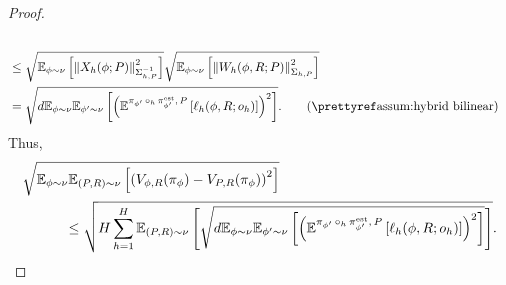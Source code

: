 \begin{proof}
\begin{align*}
\\&\le \sqrt{\E_{\phi \sim \nu}\left[\left\|X_h(\phi; P)\right\|_{\Sigma_{h,P}^{-1}}^2\right]} \sqrt{\E_{\phi \sim \nu}\left[\left\|W_h(\phi, R; P)\right\|_{\Sigma_{h,P}}^2\right]}
\\&= \sqrt{d\E_{\phi \sim \nu}\E_{\phi' \sim \nu}\left[\left(  \E^{\pi_{\phi'}\,\circ_h \, \pi_{\phi'}^{\esttt}, \,P}\left[\ellest_h(\phi, R; o_h)\right]\right)^2\right]}. \tag{\pref{assum:hybrid bilinear}}
\end{align*}
Thus, 
\begin{align*}
    &\sqrt{\mathbb{E}_{\phi \sim \nu}\mathbb{E}_{(P,R) \sim \nu}\left[\left(V_{\phi, R}(\pi_{\phi}) - V_{P,R}(\pi_{\phi}) \right)^2\right]} \\
    &\qquad \quad\le  \sqrt{H\sum_{h=1}^H\mathbb{E}_{(P, R) \sim \nu}\left[\sqrt{d\mathbb{E}_{\phi \sim \nu}\mathbb{E}_{\phi' \sim \nu}\left[\left(  \mathbb{E}^{\pi_{\phi'}\,\circ_h \, \pi_{\phi'}^{\operatorname*{est}}, \,P}\left[\ell_h(\phi, R; o_h)\right]\right)^2\right]}\right]}. 
\end{align*}

\end{proof}
